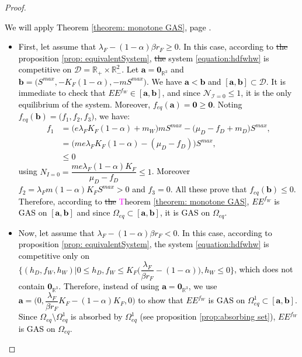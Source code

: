 \documentclass{article}
\newcommand{\lfw}{\lambda_{F}}
\newcommand{\lfw}{\lambda_{F}}
\newcommand{\cI}{\mathcal{I}}
\newcommand{\R}{\mathbb{R}}
\newcommand{\N}{\mathcal{N}}
\newcommand{\YD}[1]{\textcolor{magenta}{#1}}
\newcommand{\vdeux}[1]{\textcolor{black}{#1}}
\theoremstyle{definition}
\theoremstyle{remark}
\begin{document}
\begin{proof}
\vdeux{
We will apply Theorem \ref{theorem: monotone GAS}, page \pageref{theorem: monotone GAS}.
\begin{itemize}
\item First, let assume that $\lfw -(1-\alpha) \beta r_F \geq 0$. In this case, according to \sout{the} proposition \ref{prop: equivalentSystem}, \sout{the} system \eqref{equation:hdfwhw} is competitive on $\mathcal{D} = \R_+\times \R_-^2$. Let $\mathbf{a} = \mathbf{0}_{\R^3}$ and $\mathbf{b} = \Big(S^{max}, -K_F(1-\alpha), -mS^{max}\Big)$. We have $\mathbf{a} < \mathbf{b}$ and $[\mathbf{a}, \mathbf{b}] \subset \mathcal{D}$. 
It is immediate to check that $EE^{f_W} \in [\mathbf{a}, \mathbf{b}]$, and since $\N_{\cI = 0} \leq 1$, it is the only equilibrium of the system. Moreover, $f_{eq}(\mathbf{a}) = \mathbf{0} \geq \mathbf{0}$. Noting $f_{eq}(\mathbf{b}) = \Big(f_1, f_2, f_3\Big)$, we have:
\begin{align*}
f_1 &= \Big(e\lfw K_F(1-\alpha) + m_W\Big)mS^{max} - \Big(\mu_D - f_D + m_D\Big) S^{max}, \\
&= \Big(m e\lfw K_F(1-\alpha) - (\mu_D - f_D) \Big)S^{max}, \\
& \leq 0
\end{align*}
using $N_{I= 0} = \dfrac{m e \lfw (1-\alpha)K_F}{\mu_D - f_D} \leq 1$. 
Moreover $f_2 = \lfw m (1-\alpha) K_F S^{max} > 0$ and $f_3 = 0$. All these prove that $f_{eq}(\mathbf{b}) \leq 0$. Therefore, according to \sout{the} \YD{T}heorem \ref{theorem: monotone GAS}, $EE^{f_W}$ is GAS on $[\mathbf{a}, \mathbf{b}]$ and since $\Omega_{eq} \subset [\mathbf{a}, \mathbf{b}]$, it is GAS on $\Omega_{eq}$.
\item Now, let assume that $\lfw -(1-\alpha) \beta r_F < 0$. In this case, according to proposition \ref{prop: equivalentSystem}, the system \eqref{equation:hdfwhw} is competitive only on $\Big\{(h_D, f_W, h_W) | 0 \leq h_D, f_W \leq K_F\big(\dfrac{\lfw}{\beta r_F}-(1-\alpha)\big), h_W \leq 0 \Big\}$, which does not contain $\mathbf{0}_{\R^3}$. Therefore, instead of using $\mathbf{a}= \mathbf{0}_{\R^3}$, we use $\mathbf{a} = \Big(0, \dfrac{\lfw}{\beta r_F}K_F -	(1-\alpha)K_F, 0 \Big)$  to show that $EE^{f_W}$ is GAS on $\Omega_{eq}^1 \subset[\mathbf{a}, \mathbf{b}]$. Since $\Omega_{eq}\setminus\Omega_{eq}^1$ is absorbed by $\Omega_{eq}^1$ (see proposition \ref{prop:absorbing set}), $EE^{f_W}$ is GAS on $\Omega_{eq}$.
\end{itemize}}
\end{proof}
\end{document}
